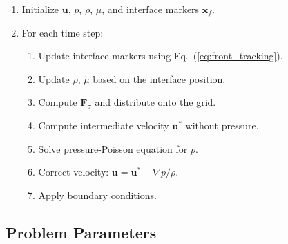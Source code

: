 \documentclass[12pt]{article}
\begin{document}
\begin{enumerate}
    \item Initialize $\mathbf{u}$, $p$, $\rho$, $\mu$, and interface markers $\mathbf{x}_f$.
    \item For each time step:
    \begin{enumerate}
        \item Update interface markers using Eq.~(\ref{eq:front_tracking}).
        \item Update $\rho$, $\mu$ based on the interface position.
        \item Compute $\mathbf{F}_\sigma$ and distribute onto the grid.
        \item Compute intermediate velocity $\mathbf{u}^*$ without pressure.
        \item Solve pressure-Poisson equation for $p$.
        \item Correct velocity: $\mathbf{u} = \mathbf{u}^* - \nabla p / \rho$.
        \item Apply boundary conditions.
    \end{enumerate}
\end{enumerate}







\subsection{Problem Parameters}
\end{document}
